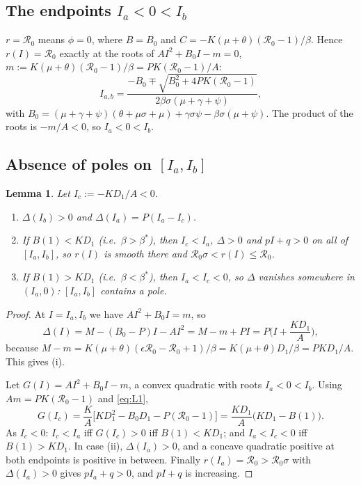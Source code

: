 \documentclass[11pt]{article}
\newtheorem{lemma}{Lemma}[section]
\theoremstyle{remark}
\newcommand{\R}{\mathcal R_0}
\begin{document}
\subsection{The endpoints $I_a<0<I_b$}

$r=\R$ means $\phi=0$, where $B=B_0$ and $C=-K(\mu+\theta)(\R-1)/\beta$. Hence $r(I)=\R$ exactly at the roots of $AI^2+B_0I-m=0$, $m:=K(\mu+\theta)(\R-1)/\beta=PK(\R-1)/A$:
\begin{equation}
I_{a,b}=\frac{-B_0\mp\sqrt{B_0^2+4PK(\R-1)}}{2\beta\sigma(\mu+\gamma+\psi)},
\label{eq:Iab}
\end{equation}
with $B_0=(\mu+\gamma+\psi)(\theta+\mu\sigma+\mu)+\gamma\sigma\psi-\beta\sigma(\mu+\psi)$. The product of the roots is $-m/A<0$, so $I_a<0<I_b$.

\subsection{Absence of poles on $[I_a,I_b]$}

\begin{lemma}\label{lem:nopole}
Let $I_c:=-KD_1/A<0$.
\begin{enumerate}
\item[(i)] $\Delta(I_b)>0$ and $\Delta(I_a)=P(I_a-I_c)$.
\item[(ii)] If $B(1)<KD_1$ (i.e.\ $\beta>\beta^*$), then $I_c<I_a$, $\Delta>0$ and $pI+q>0$ on all of $[I_a,I_b]$, so $r(I)$ is smooth there and $\R\sigma<r(I)\le\R$.
\item[(iii)] If $B(1)>KD_1$ (i.e.\ $\beta<\beta^*$), then $I_a<I_c<0$, so $\Delta$ vanishes somewhere in $(I_a,0)$: $[I_a,I_b]$ contains a pole.
\end{enumerate}
\end{lemma}
\begin{proof}
At $I=I_a,I_b$ we have $AI^2+B_0I=m$, so
\[
\Delta(I)=M-(B_0-P)I-AI^2=M-m+PI=P\Big(I+\frac{KD_1}{A}\Big),
\]
because $M-m=K(\mu+\theta)(\epsilon\R-\R+1)/\beta=K(\mu+\theta)D_1/\beta=PKD_1/A$. This gives (i).

Let $G(I)=AI^2+B_0I-m$, a convex quadratic with roots $I_a<0<I_b$. Using $Am=PK(\R-1)$ and \eqref{eq:L1},
\[
G(I_c)=\frac KA\Big[KD_1^2-B_0D_1-P(\R-1)\Big]=\frac{KD_1}{A}\big(KD_1-B(1)\big).
\]
As $I_c<0$: $I_c<I_a$ iff $G(I_c)>0$ iff $B(1)<KD_1$; and $I_a<I_c<0$ iff $B(1)>KD_1$. In case (ii), $\Delta(I_a)>0$, and a concave quadratic positive at both endpoints is positive in between. Finally $r(I_a)=\R>\R\sigma$ with $\Delta(I_a)>0$ gives $pI_a+q>0$, and $pI+q$ is increasing.
\end{proof}
\end{document}
